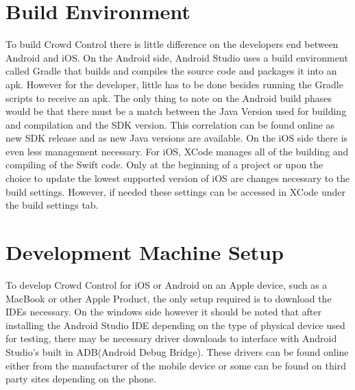 \section{Build Environment}
To build Crowd Control there is little difference on the developers end between Android and iOS.  On the Android side, Android Studio uses a build environment called Gradle that builds and compiles the source code and packages it into an apk.  However for the developer, little has to be done besides running the Gradle scripts to receive an apk.  The only thing to note on the Android build phases would be that there must be a match between the Java Version used for building and compilation and the SDK version.  This correlation can be found online as new SDK release and as new Java versions are available.  On the iOS side there is even less management necessary. For iOS, XCode manages all of the building and compiling of the Swift code.  Only at the beginning of a project or upon the choice to update the lowest supported version of iOS are changes necessary to the build settings.  However, if needed these settings can be accessed in XCode under the build settings tab.  

\section{Development Machine Setup}
To develop Crowd Control for iOS or Android on an Apple device, such as a MacBook or other Apple Product, the only setup required is to download the IDEs necessary.  On the windows side however it should be noted that after installing the Android Studio IDE depending on the type of physical device used for testing, there may be necessary driver downloads to interface with Android Studio's built in ADB(Android Debug Bridge).  These drivers can be found online either from the manufacturer of the mobile device or some can be found on third party sites depending on the phone.